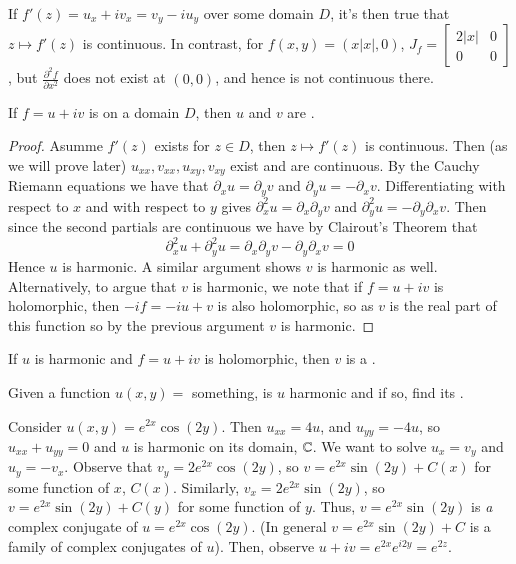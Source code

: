 \documentclass[12pt, a4paper, oneside, openright, titlepage]{book}
\begin{document}
If $f'(z) = u_x + iv_x = v_y - iu_y$ over some domain $D$, it's then true that $z \mapsto f'(z)$ is continuous. In contrast, for $f(x,y) = (x|x|,0)$, $J_f = \begin{bmatrix} 2|x|  & 0 \\ 0 & 0 \end{bmatrix}$, but $\frac{\partial^2 f}{\partial x^2}$ does not exist at $(0,0)$, and hence is not continuous there.

\begin{thm}
    If $f= u+iv$ is  on a domain $D$, then $u$ and $v$ are .
\end{thm}
\begin{proof}
    Asumme $f'(z)$ exists for $z \in D$, then $z \mapsto f'(z)$ is continuous. Then (as we will prove later) $u_{xx},v_{xx},u_{xy},v_{xy}$ exist and are continuous. By the Cauchy Riemann equations we have that $\partial_xu = \partial_yv$ and $\partial_yu = -\partial_xv$. Differentiating with respect to $x$ and with respect to $y$ gives $\partial_x^2u = \partial_x\partial_yv$ and $\partial_y^2u = -\partial_y\partial_xv$. Then since the second partials are continuous we have by Clairout's Theorem that \begin{equation*}
        \partial_x^2u+\partial_y^2u = \partial_x\partial_yv - \partial_y\partial_xv = 0
    \end{equation*}
    Hence $u$ is harmonic. A similar argument shows $v$ is harmonic as well. Alternatively, to argue that $v$ is harmonic, we note that if $f=u+iv$ is holomorphic, then $-if = -iu+v$ is also holomorphic, so as $v$ is the real part of this function so by the previous argument $v$ is harmonic.
\end{proof}


\begin{defn}
    If $u$ is harmonic and $f = u+iv$ is holomorphic, then $v$ is a .
\end{defn}



\begin{xca}
    Given a function $u(x,y) = $ something, is $u$ harmonic and if so, find its .
\end{xca}


\begin{eg}
    Consider $u(x,y) = e^{2x}\cos(2y)$. Then $u_{xx} = 4u$, and $u_{yy} = -4u$, so $u_{xx}+u_{yy} = 0$ and $u$ is harmonic on its domain, $\mathbb C$. We want to solve $u_x = v_y$ and $u_y = -v_x$. Observe that $v_y = 2e^{2x}\cos(2y)$, so $v = e^{2x}\sin(2y)+C(x)$ for some function of $x$, $C(x)$. Similarly, $v_x = 2e^{2x}\sin(2y)$, so $v = e^{2x}\sin(2y) + C(y)$ for some function of $y$. Thus, $v = e^{2x}\sin(2y)$ is \emph{a} complex conjugate of $u = e^{2x}\cos(2y)$. (In general $v = e^{2x}\sin(2y) + C$ is a family of complex conjugates of $u$). Then, observe $u+iv = e^{2x}e^{i2y} = e^{2z}$.
\end{eg}
\end{document}
